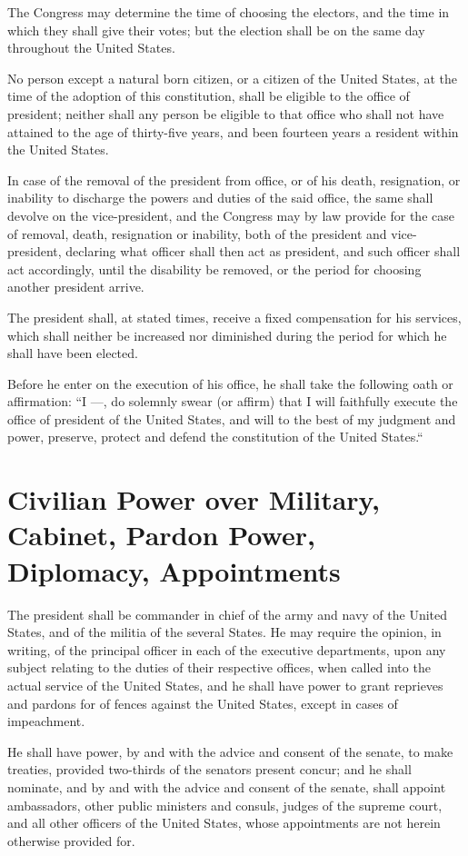 \documentclass{constitution}
\begin{document}
The Congress may determine the time of choosing the electors, and the time in which they shall give their votes;
but the election shall be on the same day throughout the United States.

No person except a natural born citizen,
or a citizen of the United States, at the time of the adoption of this constitution,
shall be eligible to the office of president;
neither shall any person be eligible to that office who shall not have attained to the age of thirty-five years,
and been fourteen years a resident within the United States.

In case of the removal of the president from office, or of his death, resignation, or inability to discharge the powers and duties of the said office, the same shall devolve on the vice-president,
and the Congress may by law provide for the case of removal, death, resignation or inability, both of the president and vice-president,
declaring what officer shall then act as president,
and such officer shall act accordingly, until the disability be removed, or the period for choosing another president arrive.

The president shall, at stated times, receive a fixed compensation for his services, which shall neither be increased nor diminished during the period for which he shall have been elected.

Before he enter on the execution of his office, he shall take the following oath or affirmation:
“I —, do solemnly swear (or affirm) that I will faithfully execute the office of president of the United States,
and will to the best of my judgment and power,
preserve, protect and defend the constitution of the United States.“

\section{Civilian Power over Military, Cabinet, Pardon Power, Diplomacy, Appointments}
The president shall be commander in chief of the army and navy of the United States,
and of the militia of the several States.
He may require the opinion, in writing, of the principal officer in each of the executive departments, upon any subject relating to the duties of their respective offices,
when called into the actual service of the United States,
and he shall have power to grant reprieves and pardons for of fences against the United States, except in cases of impeachment.

He shall have power, by and with the advice and consent of the senate, to make treaties,
provided two-thirds of the senators present concur;
and he shall nominate, and by and with the advice and consent of the senate, shall appoint ambassadors,
other public ministers and consuls,
judges of the supreme court,
and all other officers of the United States, whose appointments are not herein otherwise provided for.
\end{document}
